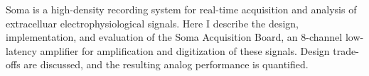 
Soma is a high-density recording system for real-time acquisition and
analysis of extracelluar electrophysiological signals. Here I describe
the design, implementation, and evaluation of the Soma Acquisition Board, 
an 8-channel low-latency amplifier for amplification and digitization
of these signals. Design trade-offs are discussed, and 
the resulting  analog performance is quantified. 
